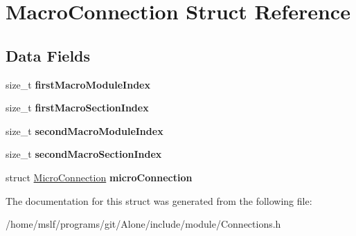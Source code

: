 \hypertarget{struct_macro_connection}{}\section{Macro\+Connection Struct Reference}
\label{struct_macro_connection}
\subsection*{Data Fields}
\begin{DoxyCompactItemize}
\item 
\hypertarget{struct_macro_connection_a81b79789265aded2ce3e8c3b7acb83a1}{}\label{struct_macro_connection_a81b79789265aded2ce3e8c3b7acb83a1} 
size\+\_\+t {\bfseries first\+Macro\+Module\+Index}
\item 
\hypertarget{struct_macro_connection_acb52f2b688edf8ad24e62f355db8a22f}{}\label{struct_macro_connection_acb52f2b688edf8ad24e62f355db8a22f} 
size\+\_\+t {\bfseries first\+Macro\+Section\+Index}
\item 
\hypertarget{struct_macro_connection_a5feea13d0b6c44d0b3a994084a9aae7d}{}\label{struct_macro_connection_a5feea13d0b6c44d0b3a994084a9aae7d} 
size\+\_\+t {\bfseries second\+Macro\+Module\+Index}
\item 
\hypertarget{struct_macro_connection_af558eb53c0c898d6e8f1af11dc1d3854}{}\label{struct_macro_connection_af558eb53c0c898d6e8f1af11dc1d3854} 
size\+\_\+t {\bfseries second\+Macro\+Section\+Index}
\item 
\hypertarget{struct_macro_connection_ac924f0083ced3c7d152081efbe458150}{}\label{struct_macro_connection_ac924f0083ced3c7d152081efbe458150} 
struct \hyperlink{struct_micro_connection}{Micro\+Connection} {\bfseries micro\+Connection}
\end{DoxyCompactItemize}


The documentation for this struct was generated from the following file\+:\begin{DoxyCompactItemize}
\item 
/home/mslf/programs/git/\+Alone/include/module/Connections.\+h\end{DoxyCompactItemize}
